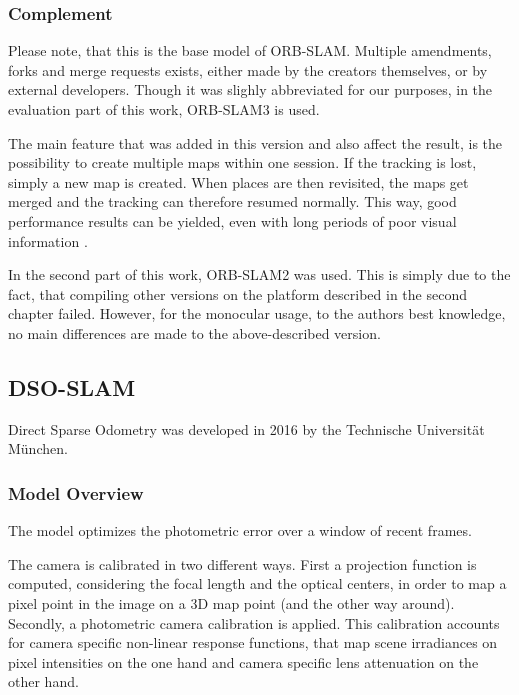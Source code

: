 	\subsubsection{Complement}
	
	Please note, that this is the base model of ORB-SLAM. Multiple amendments, forks and merge requests exists, either made by the creators themselves, 
	or by external developers. Though it was slighly abbreviated for our purposes, in the evaluation part of this work, ORB-SLAM3 is used. 
	
	The main feature that was added in this version and also affect the result, is the possibility to create multiple maps within one session. 
	If the tracking is lost, simply a new map is created. When places are then revisited, the maps get merged and the tracking can therefore 
	resumed normally.  This way, good performance results can be yielded, even with long periods of poor visual information \cite{orb3}. 
	
	In the second part of this work, ORB-SLAM2 was used. This is simply due to the fact, that compiling other versions on the platform described in the 
	second chapter failed. However, for the monocular usage, to the authors best knowledge, no main differences are made to the above-described version. 
	

	\subsection{DSO-SLAM}
	
	Direct Sparse Odometry was developed in 2016 by the Technische Universität München. %
	
	\subsubsection{Model Overview}\label{samemodel}
	
	The model optimizes the photometric error over a window of recent frames. 
	
	The camera is calibrated in two different ways. First a projection function is computed, considering the focal length and the optical centers, 
	in order to map a pixel point in the image on a 3D map point (and the other way around). Secondly, a photometric camera calibration is applied. 
	This calibration accounts for camera specific non-linear response functions, that map scene irradiances on pixel intensities on the one hand and 
	camera specific lens attenuation on the other hand. 
	
